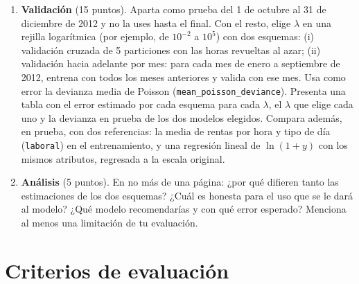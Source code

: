 \documentclass[11pt]{article}
\newcommand{\nuevapagina}{\newpage}
\begin{document}
\begin{enumerate}
\begin{enumerate}
  \item \textbf{Validación} (15 puntos). Aparta como prueba del 1 de octubre al 31 de diciembre de 2012 y no la uses hasta el final. Con el resto, elige $\lambda$ en una rejilla logarítmica (por ejemplo, de $10^{-2}$ a $10^{5}$) con dos esquemas: (i) validación cruzada de 5 particiones con las horas revueltas al azar; (ii) validación hacia adelante por mes: para cada mes de enero a septiembre de 2012, entrena con todos los meses anteriores y valida con ese mes. Usa como error la devianza media de Poisson (\texttt{mean\_poisson\_deviance}). Presenta una tabla con el error estimado por cada esquema para cada $\lambda$, el $\lambda$ que elige cada uno y la devianza en prueba de los dos modelos elegidos. Compara además, en prueba, con dos referencias: la media de rentas por hora y tipo de día (\texttt{laboral}) en el entrenamiento, y una regresión lineal de $\ln(1 + y)$ con los mismos atributos, regresada a la escala original.

  \item \textbf{Análisis} (5 puntos). En no más de una página: ¿por qué difieren tanto las estimaciones de los dos esquemas? ¿Cuál es honesta para el uso que se le dará al modelo? ¿Qué modelo recomendarías y con qué error esperado? Menciona al menos una limitación de tu evaluación.
\end{enumerate}

\end{enumerate}

\nuevapagina
\section*{Criterios de evaluación}
\end{document}
